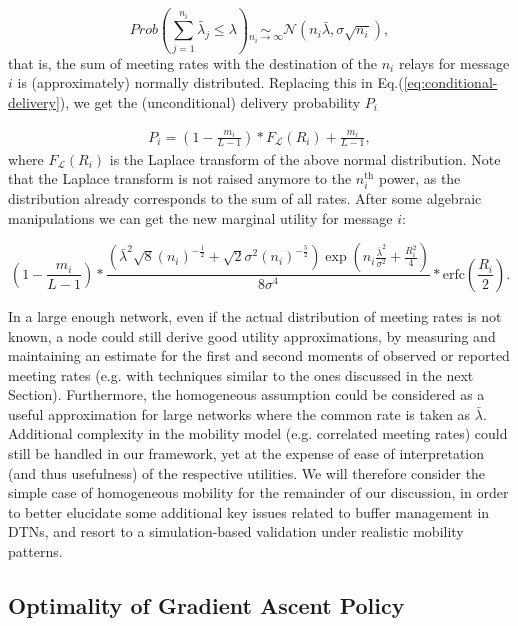 \begin{equation}
Prob(\sum_{j=1}^{n_{i}} \tilde{\lambda_{j}} \le \lambda) \underset{n_{i} \rightarrow \infty}{\sim} \mathcal{N}(n_{i}\bar{\lambda}, \sigma \sqrt{n_{i}}),
\end{equation}
that is, the sum of meeting rates with the destination of the $n_{i}$ relays for message $i$ is (approximately) normally distributed. Replacing this in Eq.(\ref{eq:conditional-delivery}), we get the (unconditional) delivery probability $P_{i}$

\begin{eqnarray*}
P_{i} = (1 - \frac{m_i}{L-1})* F_{\mathcal{L}}(R_{i}) + \frac{m_i}{L-1},
\end{eqnarray*}
where $F_{\mathcal{L}}(R_{i})$ is the Laplace transform of the above normal distribution. Note that the Laplace transform is not raised anymore to the $n_{i}^{\mbox{th}}$ power, as the distribution already corresponds to the sum of all rates. After some algebraic manipulations we can get the new marginal utility for message $i$:

\footnotesize
\begin{equation}
(1 - \frac{m_i}{L-1}) * \frac{ (\bar{\lambda}^{2} \sqrt{8} (n_{i})^{-\frac{1}{2}} + \sqrt{2} \sigma^{2} (n_{i})^{-\frac{5}{2}}) \exp( n_{i} \frac{\bar{\lambda}^{2}}{\sigma^{2}} + \frac{R_{i}^{2}}{4} )}{8 \sigma^{4}} * \mbox{erfc}(\frac{R_{i}}{2}).
\end{equation}
\normalsize

In a large enough network, even if the actual distribution of meeting rates is not known, a node could still derive good utility approximations, by measuring and maintaining an estimate for the first and second moments of observed or reported meeting rates (e.g. with techniques similar to the ones discussed in the next Section). Furthermore, the homogeneous assumption could be considered as a useful approximation for large networks where the common rate is taken as $\bar{\lambda}$. Additional complexity in the mobility model (e.g. correlated meeting rates) could still be handled in our framework, yet at the expense of ease of interpretation (and thus usefulness) of the respective utilities. We will therefore consider the simple case of homogeneous mobility for the remainder of our discussion, in order to better elucidate some additional key issues related to buffer management in DTNs, and resort to a simulation-based validation under realistic mobility patterns.

\subsection{Optimality of Gradient Ascent Policy}
\label{OptimalityOfGradientPolicy}

